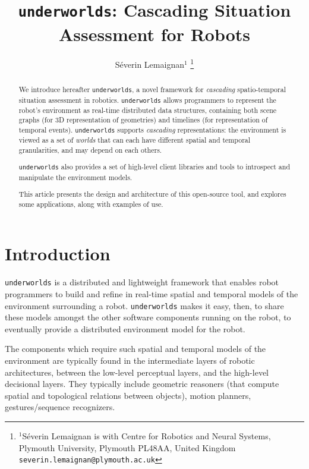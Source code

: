 \documentclass[letterpaper, 10 pt, conference]{ieeeconf}  %
\title{\LARGE \bf
{\tt underworlds}: Cascading Situation Assessment for Robots
}
\author{Séverin Lemaignan$^{1}$%
\thanks{$^{1}$Séverin Lemaignan is with Centre for Robotics and Neural Systems,
        Plymouth University, Plymouth PL48AA, United Kingdom
        {\tt\small severin.lemaignan@plymouth.ac.uk}}%
}
\newcommand{\uwds}{{\tt underworlds}\xspace}
\begin{document}
\maketitle
\thispagestyle{empty}
\pagestyle{empty}


\begin{abstract}

    We introduce hereafter \uwds, a novel framework for \emph{cascading}
    spatio-temporal situation assessment in robotics. \uwds allows programmers
    to represent the robot's environment as real-time distributed data
    structures, containing both scene graphs (for 3D representation of geometries)
    and timelines (for representation of temporal events). \uwds supports
    \emph{cascading} representations: the environment is viewed as a set of
    \emph{worlds} that can each have different spatial and temporal
    granularities, and may depend on each others.
    
    \uwds also provides a set of high-level client libraries and tools to introspect
    and manipulate the environment models.

    This article presents the design and architecture of this open-source tool,
    and explores some applications, along with examples of use.

\end{abstract}


\section{Introduction}


\uwds is a distributed and lightweight framework that enables robot programmers
to build and refine in real-time spatial and temporal models of the environment
surrounding a robot. \uwds makes it easy, then, to share these models amongst
the other software components running on the robot, to eventually provide a
distributed environment model for the robot.

The components which require such spatial and temporal models of the environment
are typically found in the intermediate layers of robotic architectures, between
the low-level perceptual layers, and the high-level decisional layers. They
typically include geometric reasoners (that compute spatial and topological
relations between objects), motion planners, gestures/sequence recognizers.
\end{document}
